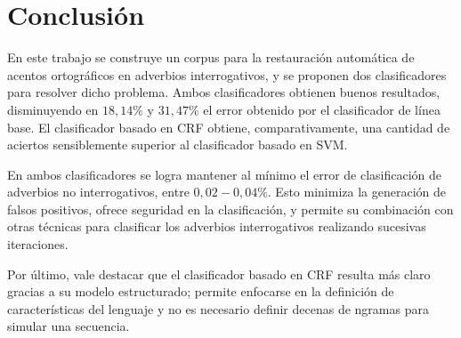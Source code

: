 \documentclass[runningheads,a4paper]{llncs}
\begin{document}
\section{Conclusión}
\label{sec:Conclusiones}

En este trabajo se construye un corpus para la restauración automática de acentos ortográficos en adverbios interrogativos, y se proponen dos clasificadores para resolver dicho problema. Ambos clasificadores obtienen buenos resultados, disminuyendo en $18,14\%$ y $31,47\%$ el error obtenido por el clasificador de línea base. El clasificador basado en CRF obtiene, comparativamente, una cantidad de aciertos sensiblemente superior al clasificador basado en SVM. 

En ambos clasificadores se logra mantener al m\'inimo el error de clasificaci\'on de adverbios no interrogativos, entre $0,02-0,04\%$. Esto minimiza la generaci\'on de falsos positivos, ofrece seguridad en la clasificaci\'on, y permite su combinaci\'on con otras t\'ecnicas para clasificar los adverbios interrogativos realizando sucesivas iteraciones.


Por \'ultimo, vale destacar que el clasificador basado en CRF resulta m\'as claro gracias a su modelo estructurado; permite enfocarse en la definición de características del lenguaje y no es necesario definir decenas de ngramas para simular una secuencia.



\end{document}
